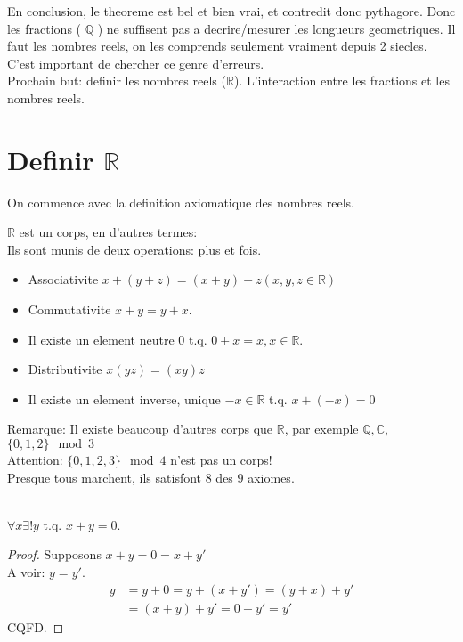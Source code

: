 \documentclass[../main.tex]{subfiles}
\begin{document}
En conclusion, le theoreme est bel et bien vrai, et contredit donc pythagore.
Donc les fractions ( $\mathbb{Q}$ ) ne suffisent pas a decrire/mesurer les longueurs geometriques.
Il faut les nombres reels, on les comprends seulement vraiment depuis 2 siecles.\\
C'est important de chercher ce genre d'erreurs.\\
Prochain but: definir les nombres reels ($\mathbb{R}$).
L'interaction entre les fractions et les nombres reels.

\chapter{Definir $\mathbb{R}$}
On commence avec la definition axiomatique des nombres reels.

\begin{axiom}\label{axiom:nombres_reels}
	$\mathbb{R}$ est un corps, en d'autres termes:\\
	Ils sont munis de deux operations: plus et fois.
	\begin{itemize}
		\item Associativite $x + ( y + z)= ( x+ y)+z ( x,y,z \in \mathbb{R})$ \\
		\item Commutativite $x+y = y+x$.\\
		\item Il existe un element neutre $0$ t.q. $0+x=x, x \in \mathbb{R}$.
		\item Distributivite $x ( yz)= ( xy)z$\\
		\item Il existe un element inverse, unique $-x \in \mathbb{R}$ t.q. $x + (-x)=0$
	\end{itemize}
\end{axiom}

Remarque: Il existe beaucoup d'autres corps que $\mathbb{R}$, par exemple $\mathbb{Q},\mathbb{C}$, $\{0,1,2\} \mod 3$\\

Attention: $ \{0,1,2,3\} \mod 4$ n'est pas un corps!\\
Presque tous marchent, ils satisfont 8 des 9 axiomes.\\
\hr\\
\begin{lemma}\label{lemma:theorem_name}
$\forall x \exists ! y$ t.q. $x+y = 0.$	
\end{lemma}
\begin{proof}
Supposons $x+y =0 = x+y'$ \\
A voir: $y=y'$.\\
 
\begin{align*}
	y &= y + 0 = y + (x + y') = ( y+x) + y'\\
	  &= ( x+y) + y' = 0 + y' = y'
\end{align*}
CQFD.
\end{proof}
\end{document}
